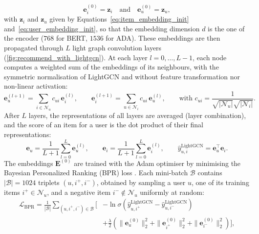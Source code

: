 \begin{mmblock}
\begin{equation}
    \mathbf{e}_i^{(0)} = \mathbf{z}_i \quad \text{and} \quad \mathbf{e}_u^{(0)} = \mathbf{z}_u,
    \label{eq:lightgcn_init}
\end{equation}
with $\mathbf{z}_i$ and $\mathbf{z}_u$ given by Equations~\ref{eq:item_embedding_init} and~\ref{eq:user_embedding_init}, so that the embedding dimension $d$ is the one of the encoder ($768$ for BERT, $1536$ for ADA). These embeddings are then propagated through $L$ light graph convolution layers (\autoref{fig:recommend_with_lightgcn}). At each layer $l = 0, \dots, L-1$, each node computes a weighted sum of the embeddings of its neighbours, with the symmetric normalisation of LightGCN and without feature transformation nor non-linear activation:
\begin{equation}
    \mathbf{e}_u^{(l+1)} = \sum_{i \in \mathcal{N}_u} c_{ui} \, \mathbf{e}_i^{(l)}, \qquad
    \mathbf{e}_i^{(l+1)} = \sum_{u \in \mathcal{N}_i} c_{ui} \, \mathbf{e}_u^{(l)}, \qquad
    \text{with } c_{ui} = \frac{1}{\sqrt{|\mathcal{N}_u|}\sqrt{|\mathcal{N}_i|}}.
    \label{eq:lightgcn_propagation}
\end{equation}
After $L$ layers, the representations of all layers are averaged (layer combination), and the score of an item for a user is the dot product of their final representations:
\begin{equation}
    \mathbf{e}_u = \frac{1}{L + 1} \sum_{l=0}^{L} \mathbf{e}_u^{(l)}, \qquad
    \mathbf{e}_i = \frac{1}{L + 1} \sum_{l=0}^{L} \mathbf{e}_i^{(l)}, \qquad
    \hat{y}_{u,i}^{\text{LightGCN}} = \mathbf{e}_u^\top \mathbf{e}_i.
    \label{eq:lightgcn_prediction}
\end{equation}
The embeddings $\mathbf{E}^{(0)}$ are trained with the Adam optimiser by minimising the Bayesian Personalized Ranking (BPR) loss \cite{bpr}. Each mini-batch $\mathcal{B}$ contains $|\mathcal{B}| = 1024$ triplets $(u, i^+, i^-)$, obtained by sampling a user $u$, one of its training items $i^+ \in \mathcal{N}_u$, and a negative item $i^- \notin \mathcal{N}_u$ uniformly at random:
\begin{equation}
    \begin{split}
    \mathcal{L}_{\text{BPR}} = \frac{1}{|\mathcal{B}|} \sum_{(u, i^+, i^-) \in \mathcal{B}} \Big[ & -\ln \sigma\left(\hat{y}_{u,i^+}^{\text{LightGCN}} - \hat{y}_{u,i^-}^{\text{LightGCN}}\right) \\
    & + \frac{\lambda}{2} \left( \|\mathbf{e}_u^{(0)}\|_2^2 + \|\mathbf{e}_{i^+}^{(0)}\|_2^2 + \|\mathbf{e}_{i^-}^{(0)}\|_2^2 \right) \Big],

\end{split}
\end{equation}
\end{mmblock}
